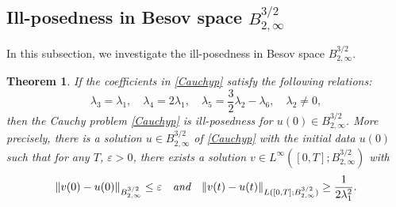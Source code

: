 \documentclass[11pt]{article}
\newtheorem{theorem}{Theorem}
\begin{document}
\subsection{Ill-posedness in Besov space $B_{2,\infty}^{3/2}$}
In this subsection, we investigate the ill-posedness in Besov space $B_{2,\infty}^{3/2}$.
\begin{theorem}\label{IPB}
If the coefficients in \eqref{Cauchyp} satisfy the following relations:
\begin{equation*}\label{constraintsforill}
\lambda_3 = \lambda_1,\quad \lambda_4 = 2\lambda_1,\quad \lambda_5 = \frac32\lambda_2 - \lambda_6,
\quad \lambda_2\neq0,
\end{equation*}
then the Cauchy problem \eqref{Cauchyp} is ill-posedness for $u(0)\in{B_{2,\infty}^{3/2}}$. More precisely, there
is a solution $u\in B_{2,\infty}^{3/2}$ of \eqref{Cauchyp} with the initial data $u(0)$ such that for any $T$, $\varepsilon>0$, there exists a solution $v\in L^\infty([0,T];{B_{2,\infty}^{3/2}})$ with
\begin{eqnarray*}
\|v(0)-u(0)\|_{B_{2,\infty}^{3/2}}\leq \varepsilon \quad \emph{and} \quad \|v(t)-u(t)\|_{L([0,T];B_{2,\infty}^{3/2})}\geq \frac{1}{2\lambda_1^2}.
\end{eqnarray*}
\end{theorem}
\end{document}
